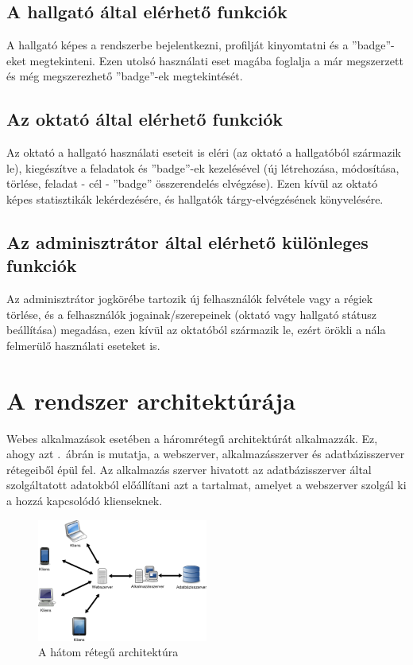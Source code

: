\documentclass[a4paper,10pt,titlepage]{article}
\begin{document}
\subsection{A hallgató által elérhető funkciók}

A hallgató képes a rendszerbe bejelentkezni, profilját kinyomtatni és a ''badge''-eket megtekinteni. Ezen utolsó használati eset magába foglalja a már megszerzett és még megszerezhető ''badge''-ek megtekintését.

\subsection{Az oktató által elérhető funkciók}

Az oktató a hallgató használati eseteit is eléri (az oktató a hallgatóból származik le), kiegészítve a feladatok és ''badge''-ek kezelésével (új létrehozása, módosítása, törlése, feladat - cél - ''badge'' összerendelés elvégzése). Ezen kívül az oktató képes statisztikák lekérdezésére, és hallgatók tárgy-elvégzésének könyvelésére. 

\subsection{Az adminisztrátor által elérhető különleges funkciók}

Az adminisztrátor jogkörébe tartozik új felhasználók felvétele vagy a régiek törlése, és a felhasználók jogainak/szerepeinek (oktató vagy hallgató státusz beállítása) megadása, ezen kívül az oktatóból származik le, ezért örökli a nála felmerülő használati eseteket is.

\section{A rendszer architektúrája}

Webes alkalmazások esetében a háromrétegű architektúrát alkalmazzák. Ez, ahogy azt .~ábrán is mutatja, a webszerver, alkalmazásszerver és adatbázisszerver rétegeiből épül fel. Az alkalmazás szerver hivatott az adatbázisszerver által szolgáltatott adatokból előállítani azt a tartalmat, amelyet a webszerver szolgál ki a hozzá kapcsolódó klienseknek.

\begin{figure}[ht!]
\centering
\includegraphics[width=0.50\textwidth]{figures/3tier_simple.png}
\caption{A hátom rétegű architektúra \label{fig:3tier_simple}}
\end{figure}
\end{document}
